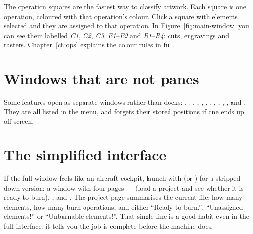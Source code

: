 The operation squares are the fastest way to classify artwork. Each square is one
operation, coloured with that operation's colour. Click a square with elements
selected and they are assigned to that operation. In
Figure~\ref{fig:main-window} you can see them labelled \emph{C1}, \emph{C2},
\emph{C3}, \emph{E1}--\emph{E9} and \emph{R1}--\emph{R4}: cuts, engravings and
rasters. Chapter~\ref{ch:ops} explains the colour rules in full.

\section{Windows that are not panes}

Some features open as separate windows rather than docks: ,
, , , ,
, , , , , , 
and . They are all listed in the  menu, and
 forgets their stored positions if one ends up off-screen.

\section{The simplified interface}

If the full window feels like an aircraft cockpit, launch with  (or
) for a stripped-down version: a window with four pages ---
 (load a project and see whether it is ready to burn),
,  and . The project page
summarises the current file: how many elements, how many burn operations, and
either ``Ready to burn.'', ``Unassigned elements!'' or ``Unburnable elements!''.
That single line is a good habit even in the full interface: it tells you the
job is complete before the machine does.

